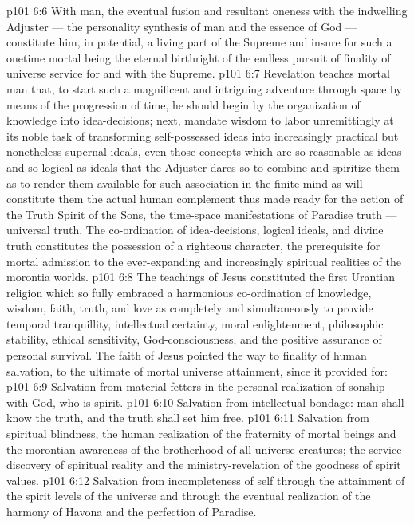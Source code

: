 \vs p101 6:6 With man, the eventual fusion and resultant oneness with the indwelling Adjuster --- the personality synthesis of man and the essence of God --- constitute him, in potential, a living part of the Supreme and insure for such a onetime mortal being the eternal birthright of the endless pursuit of finality of universe service for and with the Supreme.
\vs p101 6:7 \pc Revelation teaches mortal man that, to start such a magnificent and intriguing adventure through space by means of the progression of time, he should begin by the organization of knowledge into idea\hyp{}decisions; next, mandate wisdom to labor unremittingly at its noble task of transforming self\hyp{}possessed ideas into increasingly practical but nonetheless supernal ideals, even those concepts which are so reasonable as ideas and so logical as ideals that the Adjuster dares so to combine and spiritize them as to render them available for such association in the finite mind as will constitute them the actual human complement thus made ready for the action of the Truth Spirit of the Sons, the time\hyp{}space manifestations of Paradise truth --- universal truth. The co\hyp{}ordination of idea\hyp{}decisions, logical ideals, and divine truth constitutes the possession of a righteous character, the prerequisite for mortal admission to the ever\hyp{}expanding and increasingly spiritual realities of the morontia worlds.
\vs p101 6:8 The teachings of Jesus constituted the first Urantian religion which so fully embraced a harmonious co\hyp{}ordination of knowledge, wisdom, faith, truth, and love as completely and simultaneously to provide temporal tranquillity, intellectual certainty, moral enlightenment, philosophic stability, ethical sensitivity, God\hyp{}consciousness, and the positive assurance of personal survival. The faith of Jesus pointed the way to finality of human salvation, to the ultimate of mortal universe attainment, since it provided for:
\vs p101 6:9 \bibnobreakspace Salvation from material fetters in the personal realization of sonship with God, who is spirit.
\vs p101 6:10 \pc {}\bibnobreakspace Salvation from intellectual bondage: man shall know the truth, and the truth shall set him free.
\vs p101 6:11 \pc {}\bibnobreakspace Salvation from spiritual blindness, the human realization of the fraternity of mortal beings and the morontian awareness of the brotherhood of all universe creatures; the service\hyp{}discovery of spiritual reality and the ministry\hyp{}revelation of the goodness of spirit values.
\vs p101 6:12 \pc {}\bibnobreakspace Salvation from incompleteness of self through the attainment of the spirit levels of the universe and through the eventual realization of the harmony of Havona and the perfection of Paradise.
